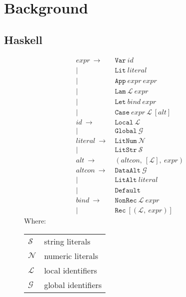 \section{Background}
\label{sec:background}

\subsection{Haskell}
\label{sec:haskell}

\begin{figure}
  \begin{equation*}
    \begin{split}
      expr\    \rightarrow\ & \texttt{Var}\ id                                       \\
                         |\ & \texttt{Lit}\ literal                                  \\
                         |\ & \texttt{App}\ expr\ expr                               \\
                         |\ & \texttt{Lam}\ \mathcal{L}\ expr                        \\
                         |\ & \texttt{Let}\ bind\ expr                               \\
                         |\ & \texttt{Case}\ expr\ \mathcal{L}\ \left[ alt \right]   \\
      id\      \rightarrow\ & \texttt{Local}\ \mathcal{L}                            \\
                         |\ & \texttt{Global}\ \mathcal{G}                           \\
      literal\ \rightarrow\ & \texttt{LitNum}\ \mathcal{N}                           \\
                         |\ & \texttt{LitStr}\ \mathcal{S}                           \\
      alt\     \rightarrow\ & ( altcon,\ [\mathcal{L}],\ expr )                      \\
      altcon\  \rightarrow\ & \texttt{DataAlt}\ \mathcal{G}                          \\
                         |\ & \texttt{LitAlt}\ literal                               \\
                         |\ & \texttt{Default}                                       \\
      bind\    \rightarrow\ & \texttt{NonRec}\ \mathcal{L}\ expr                     \\
                         |\ & \texttt{Rec}\ [ ( \mathcal{L},\ expr ) ]
    \end{split}
  \end{equation*}
  Where:
  \begin{tabular}[t]{l @{ $=$ } l}
    $\mathcal{S}$ & string literals    \\
    $\mathcal{N}$ & numeric literals   \\
    $\mathcal{L}$ & local identifiers  \\
    $\mathcal{G}$ & global identifiers
  \end{tabular}


\end{figure}
